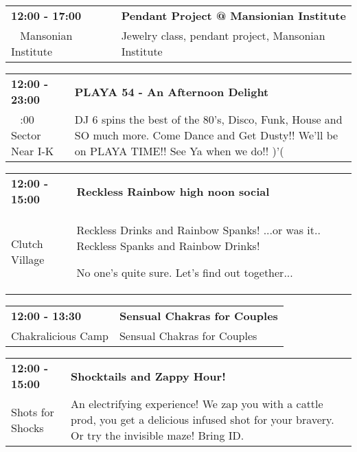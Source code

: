 \begin{tabular}{ p{1in} p{2.2in} }
    \textbf{12:00 - 17:00} & \textbf{Pendant Project @ Mansionian Institute} \\
    ~ \newline Mansonian Institute & Jewelry class, pendant project, Mansonian Institute \\
    \hline 
\end{tabular}
    
\begin{tabular}{ p{1in} p{2.2in} }
    \textbf{12:00 - 23:00} & \textbf{PLAYA 54 - An Afternoon Delight} \\
    ~ \newline 9:00 Sector Near I-K & DJ 6 spins the best of the 80's, Disco, Funk, House and SO much more. Come Dance and Get Dusty!! We'll be on PLAYA TIME!! See Ya when we do!! )'( \\
    \hline 
\end{tabular}
    
\begin{tabular}{ p{1in} p{2.2in} }
    \textbf{12:00 - 15:00} & \textbf{Reckless Rainbow high noon social} \\
    Clutch Village \newline  & Reckless Drinks and Rainbow Spanks!
...or was it.. Reckless Spanks and Rainbow Drinks!

No one's quite sure. Let's find out together... \\
    \hline 
\end{tabular}
    
\begin{tabular}{ p{1in} p{2.2in} }
    \textbf{12:00 - 13:30} & \textbf{Sensual Chakras for Couples} \\
    Chakralicious Camp \newline  & Sensual Chakras for Couples \\
    \hline 
\end{tabular}
    
\begin{tabular}{ p{1in} p{2.2in} }
    \textbf{12:00 - 15:00} & \textbf{Shocktails and Zappy Hour! } \\
    Shots for Shocks \newline  & An electrifying experience! We zap you with a cattle prod, you get a delicious infused shot for your bravery. Or try the invisible maze! Bring ID. \\
    \hline 
\end{tabular}
    

